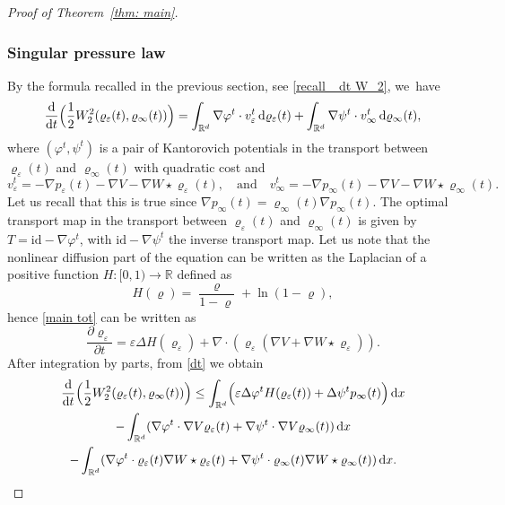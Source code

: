 \documentclass[11pt]{article}
\numberwithin{equation}{section}
\newcommand{\Bprt}[1]{\Bigl(#1\Bigr)}
\newcommand{\partialt}[1]{\dfrac{\partial#1}{\partial t}}
\newcommand{\dx}[1]{\mathop{}\!\mathrm{d} #1}
\newcommand{\ddt}{\frac{\dx{}}{\dx{t}}}
\newcommand{\R}{\mathbb{R}}
\theoremstyle{plain}
\theoremstyle{remark}
\begin{document}
\begin{proof}[Proof of Theorem~\ref{thm: main}]
\subsubsection*{Singular pressure law}
By the formula recalled in the previous section, see \eqref{recall_ dt W_2}, we~have\enlargethispage{-3\baselineskip}
\begin{equation}\label{dt}
\ddt \Bprt{\frac 12 W_2^2(\varrho_\varepsilon(t), \varrho_\infty(t))} = \int_{\R^d} \nabla \varphi^t \cdot v^t_\varepsilon \dx{\varrho_\varepsilon(t)} + \int_{\R^d} \nabla \psi^t \cdot v^t_\infty \dx{\varrho_\infty(t)},
\end{equation}
where $(\varphi^t, \psi^t)$ is a pair of Kantorovich potentials in the transport between $\varrho_\varepsilon(t)$ and $\varrho_\infty(t)$ with quadratic cost and
\[
v^t_\varepsilon = -\nabla p_\varepsilon(t) - \nabla V - \nabla W \star \varrho_\varepsilon(t),\quad \text{and}\quad v^t_\infty = -\nabla p_\infty(t) - \nabla V - \nabla W \star \varrho_\infty(t).
\]
Let us recall that this is true since $\nabla p_\infty(t) = \varrho_\infty(t)\nabla p_\infty(t)$.
The optimal transport map in the transport between $\varrho_\varepsilon(t)$ and $\varrho_\infty(t)$ is given by $T= \mathrm{id} - \nabla \varphi^t$, with $\mathrm{id} - \nabla \psi^t$ the inverse transport map.
Let us note that the nonlinear diffusion part of the equation can be written as the Laplacian of a positive function $H:[0,1)\to\R$ defined as
\begin{equation}\label{eq: H}
H(\varrho) = \frac{\varrho}{1-\varrho} + \ln (1-\varrho),
\end{equation}
hence \eqref{main tot} can be written as
\begin{equation*}\label{main tot es}
\partialt{\varrho_\varepsilon} = \varepsilon\Delta H(\varrho_\varepsilon)+ \nabla \cdot(\varrho_\varepsilon( \nabla V + \nabla W \star \varrho_\varepsilon)).
\end{equation*}
After integration by parts, from \eqref{dt} we obtain
\begin{multline}\label{dt W2}
\ddt \Bigl(\frac 12 W_2^2(\varrho_\varepsilon(t), \varrho_\infty(t))\Bigr)
\leq \int_{\R^d} \Bprt{\varepsilon \Delta \varphi^t H(\varrho_\varepsilon(t)) +\Delta \psi^t p_\infty(t) }\dx x\\
- \int_{\R^d} (\nabla \varphi^t \cdot \nabla V \varrho_\varepsilon(t) + \nabla \psi^t \cdot \nabla V \varrho_\infty(t)) \dx x\\
- \int_{\R^d} (\nabla \varphi^t \cdot \varrho_\varepsilon(t)\nabla W\star \varrho_\varepsilon(t) +\nabla \psi^t \cdot \varrho_\infty(t)\nabla W\star \varrho_\infty(t)) \dx x.

\end{multline}
\end{proof}
\end{document}
